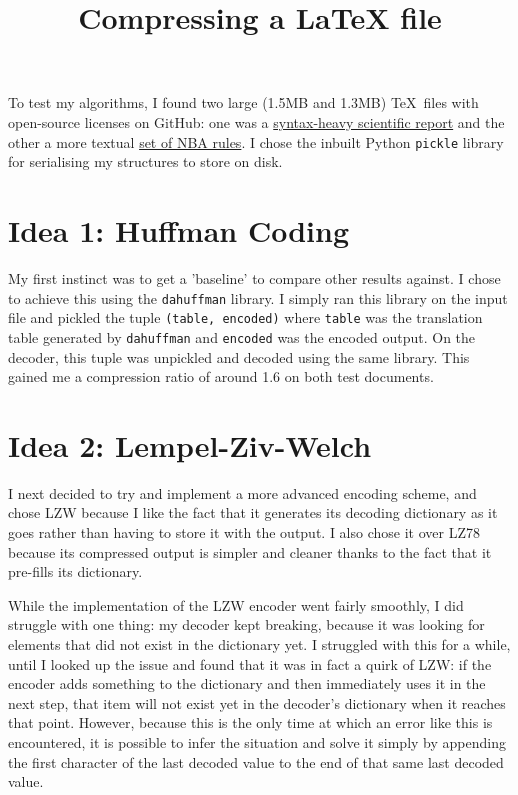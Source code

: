\documentclass[11pt]{article} %
\title{\vspace{-1.6cm}Compressing a LaTeX file}
\date{} %
\begin{document}
\maketitle

\vspace{-1.5cm}

To test my algorithms, I found two large (1.5MB and 1.3MB) \rmfamily\TeX\normalfont\ files with open-source licenses on GitHub: one was a \href{https://github.com/robertgj/DesignOfIIRFilters/blob/master/DesignOfIIRFilters.tex}{syntax-heavy scientific report} and the other a more textual \href{https://github.com/atlhawksfanatic/NBA-CBA/blob/master/docs/nba-cba-2017.tex}{set of NBA rules}. I chose the inbuilt Python \verb|pickle| library for serialising my structures to store on disk.


\section{Idea 1: Huffman Coding}

My first instinct was to get a 'baseline' to compare other results against. I chose to achieve this using the \verb|dahuffman| library. I simply ran this library on the input file and pickled the tuple \verb|(table, encoded)| where \verb|table| was the translation table generated by \verb|dahuffman| and \verb|encoded| was the encoded output. On the decoder, this tuple was unpickled and decoded using the same library. This gained me a compression ratio of around 1.6 on both test documents.


\section{Idea 2: Lempel-Ziv-Welch}

I next decided to try and implement a more advanced encoding scheme, and chose LZW because I like the fact that it generates its decoding dictionary as it goes rather than having to store it with the output. I also chose it over LZ78 because its compressed output is simpler and cleaner thanks to the fact that it pre-fills its dictionary.

While the implementation of the LZW encoder went fairly smoothly, I did struggle with one thing: my decoder kept breaking, because it was looking for elements that did not exist in the dictionary yet. I struggled with this for a while, until I looked up the issue and found that it was in fact a quirk of LZW: if the encoder adds something to the dictionary and then immediately uses it in the next step, that item will not exist yet in the decoder's dictionary when it reaches that point. However, because this is the only time at which an error like this is encountered, it is possible to infer the situation and solve it simply by appending the first character of the last decoded value to the end of that same last decoded value.
\end{document}
